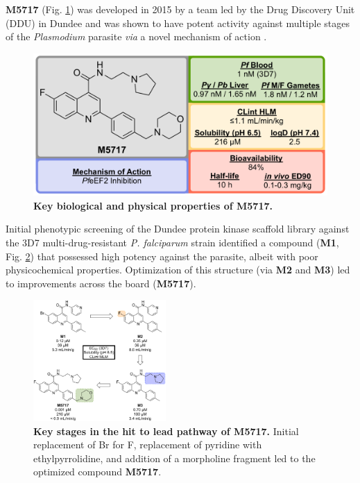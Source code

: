 \documentclass[twocolumn]{bmcart}%
\begin{document}
\hrulefill

\textbf{M5717} (Fig. \ref{Figure6}) was developed in 2015 by a team led by the Drug Discovery Unit (DDU) in Dundee and was shown to have potent activity against multiple stages of the \textit{Plasmodium} parasite \textit{via} a novel mechanism of action \cite{Baragana2015,Baragana2016}.

\begin{figure}[h]
	\includegraphics [scale=0.575] {Figure6}
	\caption{\bf Key biological and physical properties of M5717.}
	\label{Figure6}
\end{figure}

Initial phenotypic screening of the Dundee protein kinase scaffold library against the 3D7 multi-drug-resistant \textit{P. falciparum} strain identified a compound (\textbf{M1}, Fig. \ref{Figure7}) that possessed high potency against the parasite, albeit with poor physicochemical properties. Optimization of this structure (via \textbf{M2} and \textbf{M3}) led to improvements across the board (\textbf{M5717}).

\begin{figure}[h]
	\includegraphics [width=0.45\textwidth] {Figure7}
	\caption{{\bf Key stages in the hit to lead pathway of M5717.} Initial replacement of Br for F, replacement of pyridine with ethylpyrrolidine, and addition of a morpholine fragment led to the optimized compound \textbf{M5717}.}
	\label{Figure7}
\end{figure}
\end{document}
